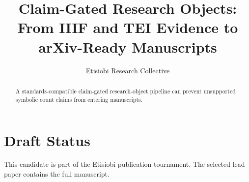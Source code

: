 \documentclass[manuscript]{acmart}
\title{Claim-Gated Research Objects: From IIIF and TEI Evidence to arXiv-Ready Manuscripts}
\author{Etisiobi Research Collective}
\affiliation{\institution{The Beaconsmith Collective}\country{Nigeria}}
\begin{document}
\begin{abstract}
A standards-compatible claim-gated research-object pipeline can prevent unsupported symbolic count claims from entering manuscripts.
\end{abstract}
\maketitle
\section{Draft Status}
This candidate is part of the Etisiobi publication tournament. The selected lead paper contains the full manuscript.


\end{document}
